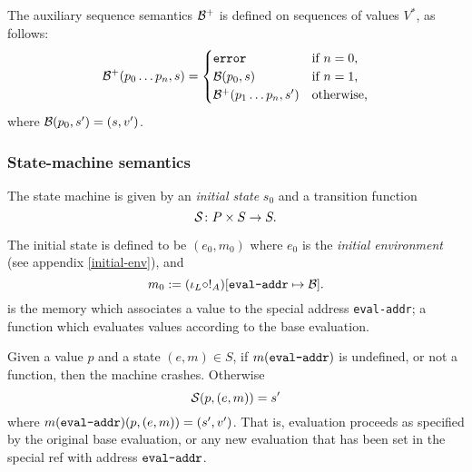 The auxiliary sequence semantics $\B^+$ is defined on sequences of values $V^*$, as follows:
  \[
    \B^+(p_0 \ldots p_n, s) =
    \begin{cases}
      \mathtt{error} & \text{if $n = 0$,}\\
      \B(p_0, s) & \text{if $n = 1$,}\\
      \B^+(p_1 \ldots p_n, s') & \text{otherwise,}
    \end{cases}
  \]
  where $\B(p_0, s') = (s, v')$.

\subsubsection{State-machine semantics}
The \rad{} state machine is given by an \emph{initial state} $s_0$ and a
transition function
\[
  \S \colon P \times S \to S.
\]

The initial state is defined to be $(e_0,m_0)$ where $e_0$ is the \emph{initial
  environment} (see appendix \ref{initial-env}), and
\[
  m_0 := (\iota_L \circ !_A)[\text{\texttt{eval-addr}} \mapsto \B].
\]
is the memory which associates a value to the special address
\texttt{eval-addr}; a function which evaluates values according to the base
evaluation.

Given a value $p$ and a state $(e,m) \in S$, if $m(\text{\texttt{eval-addr}})$
is undefined, or not a function, then the machine crashes. Otherwise
\[
  \S(p, (e,m)) = s'
\]
where $m(\text{\texttt{eval-addr}})(p,(e,m)) = (s', v')$.
That is, evaluation proceeds as specified by the original base evaluation, or
any new evaluation that has been set in the special ref with address $\evalAddr$.
